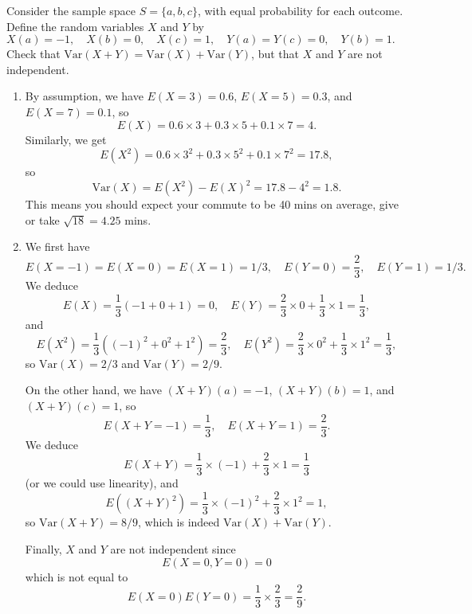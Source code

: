 \documentclass{article}
\theoremstyle{definition}
\begin{document}
\begin{question}
    Consider the sample space $S = \{ a, b, c \}$, with equal probability for each outcome. Define the random variables $X$ and  
    $Y$ by $X(a) = -1, \quad X(b) = 0, \quad X(c) = 1, \quad Y(a) = Y(c) = 0, \quad Y(b) = 1.$ 
    Check that $\mathrm{Var}(X+Y) = \mathrm{Var}(X) + \mathrm{Var}(Y)$, but that $X$ and $Y$ are not independent.
\end{question}
\begin{solution}
\begin{enumerate}
	 \item By assumption, we have $E(X = 3) = 0.6$, $E(X = 5) = 0.3$, and $E(X = 7) = 0.1$, so
	\[
	E(X) = 0.6 \times 3 + 0.3 \times 5 + 0.1 \times 7 = 4.
	\]
	 Similarly, we get
	\[
	E(X^2) = 0.6 \times 3^2 + 0.3 \times 5^2 + 0.1 \times 7^2 = 17.8,
	\]
	so
	\[
	\mathrm{Var}(X) = E(X^2) - E(X)^2 = 17.8 - 4^2 = 1.8.
	\]
	This means you should expect your commute to be 40 mins on average, give or take $\sqrt{18}=4.25$ mins.
	\item We first have
	\[
	E(X = -1) = E(X = 0) = E(X = 1) = 1/3, \quad E(Y = 0) = \frac23, \quad E(Y = 1) = 1/3.
	\]
	We deduce
	\[
	E(X) = \frac13 \left ( -1 + 0 + 1 \right ) = 0, \quad E(Y) = \frac23 \times 0 + \frac13 \times 1 = \frac13,
	\]
	and
	\[
	E(X^2) = \frac13 \left ( (-1)^2 + 0^2 + 1^2 \right ) = \frac23, \quad E(Y^2) = \frac23 \times 0^2 + \frac13 \times 1^2 = \frac13,
	\]
	so $\mathrm{Var}(X) = 2/3$ and $\mathrm{Var}(Y) = 2/9$. 
	
	On the other hand, we have $(X+Y)(a) = -1$, $(X+Y)(b) = 1$, and $(X+Y)(c) = 1$, so
	\[
	E(X+Y = -1) = \frac13, \quad E(X+Y = 1) = \frac23.
	\]
	We deduce
	\[
	E(X+Y) = \frac13 \times (-1) + \frac23 \times 1 = \frac13
	\]
	(or we could use linearity), and
	\[
	E((X+Y)^2) = \frac13 \times (-1)^2 + \frac23 \times 1^2 = 1,
	\]
	so $\mathrm{Var}(X+Y) = 8/9$, which is indeed $\mathrm{Var}(X) + \mathrm{Var}(Y)$.
	
	Finally, $X$ and $Y$ are not independent since
	\[
	E(X = 0, Y = 0)  = 0 
	\]
	which is not equal to
	\[
	E(X = 0) E(Y = 0) = \frac13 \times \frac23 = \frac 29.
	\]
	
\end{enumerate}
\end{solution}
\end{document}
